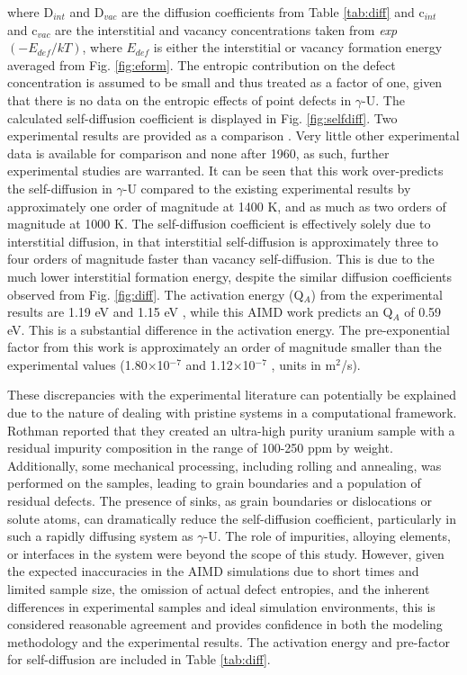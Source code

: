 \documentclass[review]{elsarticle}
\begin{document}
where D$_{int}$ and D$_{vac}$ are the diffusion coefficients from Table \ref{tab:diff} and c$_{int}$ and c$_{vac}$ are the interstitial and vacancy concentrations taken from \textit{exp}$(-E_{def}/kT)$, where $E_{def}$ is either the interstitial or vacancy formation energy averaged from Fig. \ref{fig:eform}. The entropic contribution on the defect concentration is assumed to be small and thus treated as a factor of one, given that there is no data on the entropic effects of point defects in $\gamma$-U. The calculated self-diffusion coefficient is displayed in Fig. \ref{fig:selfdiff}. Two experimental results are provided as a comparison \cite{rothman1959,adda1959}. Very little other experimental data is available for comparison and none after 1960, as such, further experimental studies are warranted. It can be seen that this work over-predicts the self-diffusion in $\gamma$-U compared to the existing experimental results by approximately one order of magnitude at 1400 K, and as much as two orders of magnitude at 1000 K. The self-diffusion coefficient is effectively solely due to interstitial diffusion, in that interstitial self-diffusion is approximately three to four orders of magnitude faster than vacancy self-diffusion. This is due to the much lower interstitial formation energy, despite the similar diffusion coefficients observed from Fig. \ref{fig:diff}. The activation energy (Q$_A$) from the experimental results are 1.19 eV \cite{adda1959} and 1.15 eV \cite{rothman1959}, while this AIMD work predicts an Q$_A$ of 0.59 eV. This is a substantial difference in the activation energy. The pre-exponential factor from this work is approximately an order of magnitude smaller than the experimental values (1.80$\times$10$^{-7}$ \cite{adda1959} and 1.12$\times$10$^{-7}$ \cite{rothman1959}, units in m$^2$/s). 

These discrepancies with the experimental literature can potentially be explained due to the nature of dealing with pristine systems in a computational framework. Rothman \cite{rothman1959} reported that they created an ultra-high purity uranium sample with a residual impurity composition in the range of 100-250 ppm by weight. Additionally, some mechanical processing, including rolling and annealing, was performed on the samples, leading to grain boundaries and a population of residual defects. The presence of sinks, as grain boundaries or dislocations or solute atoms, can dramatically reduce the self-diffusion coefficient, particularly in such a rapidly diffusing system as $\gamma$-U. The role of impurities, alloying elements, or interfaces in the system were beyond the scope of this study. However, given the expected inaccuracies in the AIMD simulations due to short times and limited sample size, the omission of actual defect entropies, and the inherent differences in experimental samples and ideal simulation environments, this is considered reasonable agreement and provides confidence in both the modeling methodology and the experimental results. The activation energy and pre-factor for self-diffusion are included in Table \ref{tab:diff}. 
\end{document}
